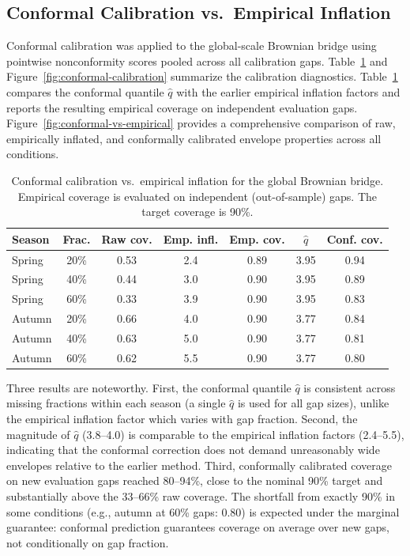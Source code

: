 \documentclass[pdflatex,sn-vancouver-num]{sn-jnl}
\begin{document}
\subsection{Conformal Calibration vs.\ Empirical Inflation}\label{conformal-calibration-results}

Conformal calibration was applied to the global-scale Brownian bridge using pointwise nonconformity scores pooled across all calibration gaps. Table~\ref{tab:conformal-calibration} and Figure~\ref{fig:conformal-calibration} summarize the calibration diagnostics. Table~\ref{tab:conformal-calibration} compares the conformal quantile $\hat q$ with the earlier empirical inflation factors and reports the resulting empirical coverage on independent evaluation gaps. Figure~\ref{fig:conformal-vs-empirical} provides a comprehensive comparison of raw, empirically inflated, and conformally calibrated envelope properties across all conditions.

\begin{table}[t]
\centering
\caption{Conformal calibration vs.\ empirical inflation for the global Brownian bridge. Empirical coverage is evaluated on independent (out-of-sample) gaps. The target coverage is 90\%.}
\label{tab:conformal-calibration}
\small
\begin{tabular}{lcccccc}
\toprule
Season & Frac. & Raw cov. & Emp. infl. & Emp. cov. & $\hat q$ & Conf. cov. \\
\midrule
Spring & 20\% & 0.53 & 2.4 & 0.89 & 3.95 & 0.94 \\
Spring & 40\% & 0.44 & 3.0 & 0.90 & 3.95 & 0.89 \\
Spring & 60\% & 0.33 & 3.9 & 0.90 & 3.95 & 0.83 \\
Autumn & 20\% & 0.66 & 4.0 & 0.90 & 3.77 & 0.84 \\
Autumn & 40\% & 0.63 & 5.0 & 0.90 & 3.77 & 0.81 \\
Autumn & 60\% & 0.62 & 5.5 & 0.90 & 3.77 & 0.80 \\
\bottomrule
\end{tabular}
\end{table}

Three results are noteworthy. First, the conformal quantile $\hat q$ is consistent across missing fractions within each season (a single $\hat q$ is used for all gap sizes), unlike the empirical inflation factor which varies with gap fraction. Second, the magnitude of $\hat q$ (3.8--4.0) is comparable to the empirical inflation factors (2.4--5.5), indicating that the conformal correction does not demand unreasonably wide envelopes relative to the earlier method. Third, conformally calibrated coverage on new evaluation gaps reached 80--94\%, close to the nominal 90\% target and substantially above the 33--66\% raw coverage. The shortfall from exactly 90\% in some conditions (e.g., autumn at 60\% gaps: 0.80) is expected under the marginal guarantee: conformal prediction guarantees coverage on average over new gaps, not conditionally on gap fraction.
\end{document}
